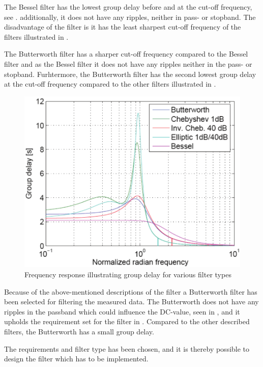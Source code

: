 The Bessel filter has the lowest group delay before and at the cut-off frequency, see . additionally, it does not have any ripples, neither in pass- or stopband. The disadvantage of the filter is it has the least sharpest cut-off frequency of the filters illustrated in .

The Butterworth filter has a sharper cut-off frequency compared to the Bessel filter and as the Bessel filter it does not have any ripples neither in the pass- or stopband. Furhtermore, the Butterworth filter has the second lowest group delay at the cut-off frequency compared to the other filters illustrated in . 

\begin{figure}[H]
	\centering
	\includegraphics[scale=0.7]{figures/Filtertypes2.pdf}
	\caption{Frequency response illustrating group delay for various filter types}
	\label{fig:groupdelay}
\end{figure}

Because of the above-mentioned descriptions of the filter a Butterworth filter has been selected for filtering the measured data. The Butterworth does not have any ripples in the passband which could influence the DC-value, seen in , and it upholds the requirement set for the filter in . Compared to the other described filters, the Butterworth has a small group delay.

The requirements and filter type has been chosen, and it is thereby possible to design the filter which has to be implemented.

